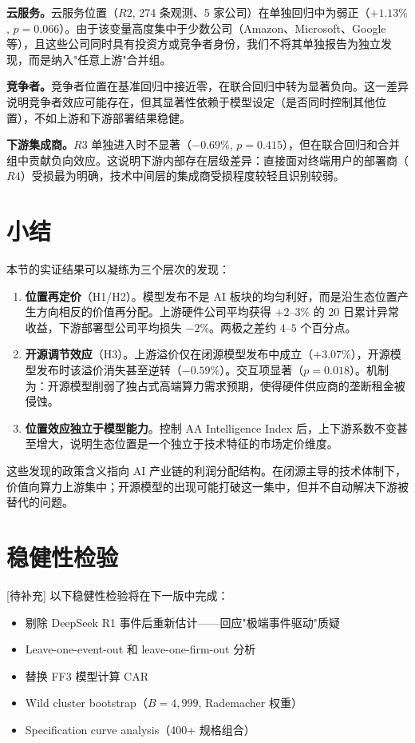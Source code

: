 \documentclass[11pt,fontset=fandol,a4paper]{ctexart}
\begin{document}
\textbf{云服务。}云服务位置（$R2$, 274 条观测、5 家公司）在单独回归中为弱正（$+1.13\%$, $p=0.066$）。由于该变量高度集中于少数公司（Amazon、Microsoft、Google 等），且这些公司同时具有投资方或竞争者身份，我们不将其单独报告为独立发现，而是纳入"任意上游"合并组。

\textbf{竞争者。}竞争者位置在基准回归中接近零，在联合回归中转为显著负向。这一差异说明竞争者效应可能存在，但其显著性依赖于模型设定（是否同时控制其他位置），不如上游和下游部署结果稳健。

\textbf{下游集成商。}$R3$ 单独进入时不显著（$-0.69\%$, $p=0.415$），但在联合回归和合并组中贡献负向效应。这说明下游内部存在层级差异：直接面对终端用户的部署商（$R4$）受损最为明确，技术中间层的集成商受损程度较轻且识别较弱。

\section{小结}

本节的实证结果可以凝练为三个层次的发现：

\begin{enumerate}
\item \textbf{位置再定价}（H1/H2）。模型发布不是 AI 板块的均匀利好，而是沿生态位置产生方向相反的价值再分配。上游硬件公司平均获得 $+2\text{--}3\%$ 的 20 日累计异常收益，下游部署型公司平均损失 $-2\%$。两极之差约 $4\text{--}5$ 个百分点。

\item \textbf{开源调节效应}（H3）。上游溢价仅在闭源模型发布中成立（$+3.07\%$），开源模型发布时该溢价消失甚至逆转（$-0.59\%$）。交互项显著（$p=0.018$）。机制为：开源模型削弱了独占式高端算力需求预期，使得硬件供应商的垄断租金被侵蚀。

\item \textbf{位置效应独立于模型能力}。控制 AA Intelligence Index 后，上下游系数不变甚至增大，说明生态位置是一个独立于技术特征的市场定价维度。
\end{enumerate}

这些发现的政策含义指向 AI 产业链的利润分配结构。在闭源主导的技术体制下，价值向算力上游集中；开源模型的出现可能打破这一集中，但并不自动解决下游被替代的问题。

\section{稳健性检验}\label{sec:robust}

[待补充] 以下稳健性检验将在下一版中完成：

\begin{itemize}
\item 剔除 DeepSeek R1 事件后重新估计——回应"极端事件驱动"质疑
\item Leave-one-event-out 和 leave-one-firm-out 分析
\item 替换 FF3 模型计算 CAR
\item Wild cluster bootstrap（$B=4{,}999$, Rademacher 权重）
\item Specification curve analysis（400+ 规格组合）
\end{itemize}
\end{document}
